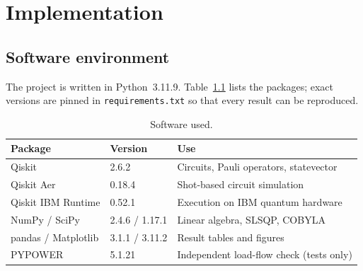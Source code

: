 \chapter{Implementation}

\section{Software environment}
The project is written in Python~3.11.9. Table~\ref{tab:sw} lists the packages; exact versions are pinned in \texttt{requirements.txt} so that every result can be reproduced.

\begin{table}[H]
\centering
\caption{Software used.}
\label{tab:sw}
\begin{tabular}{lll}
\toprule
Package & Version & Use\\
\midrule
Qiskit \cite{qiskit} & 2.6.2 & Circuits, Pauli operators, statevector\\
Qiskit Aer & 0.18.4 & Shot-based circuit simulation\\
Qiskit IBM Runtime & 0.52.1 & Execution on IBM quantum hardware\\
NumPy / SciPy & 2.4.6 / 1.17.1 & Linear algebra, SLSQP, COBYLA\\
pandas / Matplotlib & 3.1.1 / 3.11.2 & Result tables and figures\\
PYPOWER & 5.1.21 & Independent load-flow check (tests only)\\
\bottomrule
\end{tabular}
\end{table}

